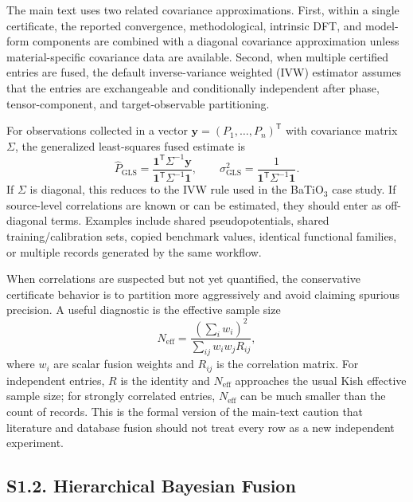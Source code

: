 ﻿\documentclass[prb,onecolumn,superscriptaddress,amsmath,amssymb,longbibliography]{revtex4-2}
\begin{document}
The main text uses two related covariance approximations. First, within a
single certificate, the reported convergence, methodological, intrinsic DFT,
and model-form components are combined with a diagonal covariance
approximation unless material-specific covariance data are available. Second,
when multiple certified entries are fused, the default inverse-variance
weighted (IVW) estimator assumes that the entries are exchangeable and
conditionally independent after phase, tensor-component, and target-observable
partitioning.

For observations collected in a vector
$\mathbf{y}=(P_1,\ldots,P_n)^{\mathsf T}$ with covariance matrix $\Sigma$, the
generalized least-squares fused estimate is
\begin{equation}
    \hat{P}_{\mathrm{GLS}} =
    \frac{\mathbf{1}^{\mathsf T}\Sigma^{-1}\mathbf{y}}
         {\mathbf{1}^{\mathsf T}\Sigma^{-1}\mathbf{1}},
    \qquad
    \sigma_{\mathrm{GLS}}^2 =
    \frac{1}{\mathbf{1}^{\mathsf T}\Sigma^{-1}\mathbf{1}} .
\end{equation}
If $\Sigma$ is diagonal, this reduces to the IVW rule used in the BaTiO$_3$
case study. If source-level correlations are known or can be estimated, they
should enter as off-diagonal terms. Examples include shared pseudopotentials,
shared training/calibration sets, copied benchmark values, identical
functional families, or multiple records generated by the same workflow.

When correlations are suspected but not yet quantified, the conservative
certificate behavior is to partition more aggressively and avoid claiming
spurious precision. A useful diagnostic is the effective sample size
\begin{equation}
    N_{\mathrm{eff}} =
    \frac{(\sum_i w_i)^2}{\sum_{ij} w_i w_j R_{ij}},
\end{equation}
where $w_i$ are scalar fusion weights and $R_{ij}$ is the correlation matrix.
For independent entries, $R$ is the identity and $N_{\mathrm{eff}}$ approaches
the usual Kish effective sample size; for strongly correlated entries,
$N_{\mathrm{eff}}$ can be much smaller than the count of records. This is the
formal version of the main-text caution that literature and database fusion
should not treat every row as a new independent experiment.

\subsection{S1.2. Hierarchical Bayesian Fusion}
\label{sec:si_bayesian}
\end{document}
